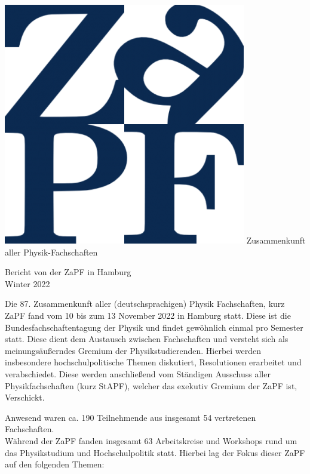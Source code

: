 \documentclass{scrartcl}
\begin{document}
	\hspace{0.74\textwidth}
	\begin{minipage}{0.25\textwidth}
		\vspace{-1cm}
		\centering
		\includegraphics[width=.89\textwidth]{logo.png}
		\small Zusammenkunft aller Physik-Fachschaften
	\end{minipage}
	
	\begin{center}
		\vspace{1.5cm}
		\huge{Bericht von der ZaPF in Hamburg \\ Winter 2022}
		\vspace{1cm}
	\end{center}
	
	Die 87. Zusammenkunft aller (deutschsprachigen) Physik Fachschaften, kurz ZaPF fand vom 10 bis zum 13 November 2022 in Hamburg statt. Diese ist die Bundesfachschaftentagung der Physik und findet gewöhnlich einmal pro Semester statt. Diese dient dem Austausch zwischen Fachschaften und versteht sich als meinungsäußerndes Gremium der Physikstudierenden. Hierbei werden insbesondere hochschulpolitische Themen diskutiert, Resolutionen erarbeitet und verabschiedet. Diese werden anschließend vom Ständigen Ausschuss aller Physikfachschaften (kurz StAPF), welcher das exekutiv Gremium der ZaPF ist, Verschickt.
	
	Anwesend waren ca. 190 Teilnehmende aus insgesamt 54 vertretenen Fachschaften.\\
	Während der ZaPF fanden insgesamt 63 Arbeitskreise und Workshops rund um das Physikstudium und Hochschulpolitik statt. Hierbei lag der Fokus dieser ZaPF auf den folgenden Themen:
	
\end{document}
